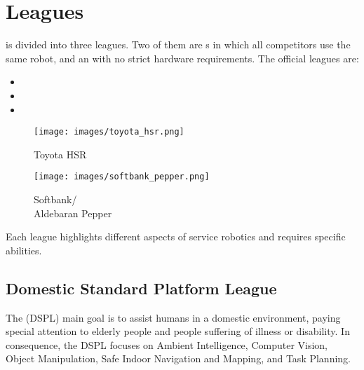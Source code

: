 \section{Leagues}
\label{sec:leagues}

 is divided into three leagues. Two of them are s in which all competitors use the same robot, and an  with no strict hardware requirements. The official leagues are:
\begin{itemize}
  \item {}
  \item {}
  \item {}
\end{itemize}

\begin{wrapfigure}[21]{r}{0.30\textwidth}
	\vspace{-30pt}
	\begin{center}
		\texttt{[image: images/toyota\_hsr.png]}
		\vspace{-10pt}
		\caption{Toyota HSR}
		\label{fig:toyotaHSR}
	\end{center}

	\vspace{-25pt}
	\begin{center}
		\texttt{[image: images/softbank\_pepper.png]}
		\vspace{-10pt}
		\caption{Softbank/ \\ Aldebaran Pepper}
		\label{fig:softbank-pepper}
	\end{center}
\end{wrapfigure}
Each league highlights different aspects of service robotics and requires specific abilities.


\subsection{Domestic Standard Platform League}
The  (DSPL) main goal is to assist humans in a domestic environment, paying special attention to elderly people and people suffering of illness or disability. In consequence, the DSPL focuses on Ambient Intelligence, Computer Vision, Object Manipulation, Safe Indoor Navigation and Mapping, and Task Planning.

